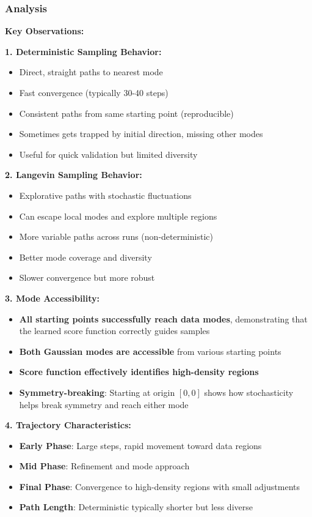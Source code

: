 \documentclass[journal]{IEEEtran}
\begin{document}
\subsubsection{Analysis}

\textbf{Key Observations:}

\textbf{1. Deterministic Sampling Behavior:}
\begin{itemize}
    \item Direct, straight paths to nearest mode
    \item Fast convergence (typically 30-40 steps)
    \item Consistent paths from same starting point (reproducible)
    \item Sometimes gets trapped by initial direction, missing other modes
    \item Useful for quick validation but limited diversity
\end{itemize}

\textbf{2. Langevin Sampling Behavior:}
\begin{itemize}
    \item Explorative paths with stochastic fluctuations
    \item Can escape local modes and explore multiple regions
    \item More variable paths across runs (non-deterministic)
    \item Better mode coverage and diversity
    \item Slower convergence but more robust
\end{itemize}

\textbf{3. Mode Accessibility:}
\begin{itemize}
    \item \textbf{All starting points successfully reach data modes}, demonstrating that the learned score function correctly guides samples
    \item \textbf{Both Gaussian modes are accessible} from various starting points
    \item \textbf{Score function effectively identifies high-density regions}
    \item \textbf{Symmetry-breaking}: Starting at origin $[0, 0]$ shows how stochasticity helps break symmetry and reach either mode
\end{itemize}

\textbf{4. Trajectory Characteristics:}
\begin{itemize}
    \item \textbf{Early Phase}: Large steps, rapid movement toward data regions
    \item \textbf{Mid Phase}: Refinement and mode approach
    \item \textbf{Final Phase}: Convergence to high-density regions with small adjustments
    \item \textbf{Path Length}: Deterministic typically shorter but less diverse
\end{itemize}
\end{document}

